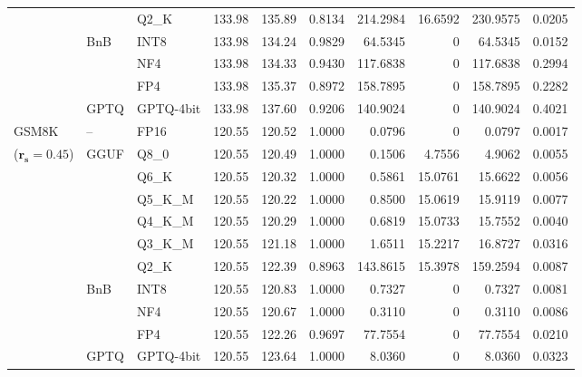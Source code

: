 \begin{longtable}{ll l rrrrrrr}
 &  & Q2\_K & 133.98 & 135.89 & \cellcolor{red!18} 0.8134 & \cellcolor{red!18} 214.2984 & 16.6592 & \cellcolor{red!18} 230.9575 & \cellcolor{red!18} 0.0205 \\
 & BnB & INT8 & 133.98 & 134.24 & 0.9829 & 64.5345 & \cellcolor{cyan!12} $0$ & 64.5345 & 0.0152 \\
 &  & NF4 & 133.98 & 134.33 & \cellcolor{red!18} 0.9430 & \cellcolor{red!18} 117.6838 & \cellcolor{cyan!12} $0$ & \cellcolor{red!18} 117.6838 & \cellcolor{red!18} 0.2994 \\
 &  & FP4 & 133.98 & 135.37 & \cellcolor{red!18} 0.8972 & \cellcolor{red!18} 158.7895 & \cellcolor{cyan!12} $0$ & \cellcolor{red!18} 158.7895 & \cellcolor{red!18} 0.2282 \\
 & GPTQ & GPTQ-4bit & 133.98 & 137.60 & \cellcolor{red!18} 0.9206 & \cellcolor{red!18} 140.9024 & \cellcolor{cyan!12} $0$ & \cellcolor{red!18} 140.9024 & \cellcolor{red!18} 0.4021 \\
\midrule
GSM8K & -- & FP16 & 120.55 & 120.52 & 1.0000 & 0.0796 & \cellcolor{cyan!12} $0$ & 0.0797 & 0.0017 \\
{\small ($\mathbf{r_s{=}0.45}$)} & GGUF & Q8\_0 & 120.55 & 120.49 & 1.0000 & 0.1506 & 4.7556 & 4.9062 & 0.0055 \\
 &  & Q6\_K & 120.55 & 120.32 & 1.0000 & 0.5861 & 15.0761 & 15.6622 & 0.0056 \\
 &  & Q5\_K\_M & 120.55 & 120.22 & 1.0000 & 0.8500 & 15.0619 & 15.9119 & 0.0077 \\
 &  & Q4\_K\_M & 120.55 & 120.29 & 1.0000 & 0.6819 & 15.0733 & 15.7552 & 0.0040 \\
 &  & Q3\_K\_M & 120.55 & 121.18 & 1.0000 & 1.6511 & 15.2217 & 16.8727 & 0.0316 \\
 &  & Q2\_K & 120.55 & 122.39 & \cellcolor{red!18} 0.8963 & \cellcolor{red!18} 143.8615 & 15.3978 & \cellcolor{red!18} 159.2594 & \cellcolor{red!18} 0.0087 \\
 & BnB & INT8 & 120.55 & 120.83 & 1.0000 & 0.7327 & \cellcolor{cyan!12} $0$ & 0.7327 & 0.0081 \\
 &  & NF4 & 120.55 & 120.67 & 1.0000 & 0.3110 & \cellcolor{cyan!12} $0$ & 0.3110 & 0.0086 \\
 &  & FP4 & 120.55 & 122.26 & 0.9697 & 77.7554 & \cellcolor{cyan!12} $0$ & 77.7554 & 0.0210 \\
 & GPTQ & GPTQ-4bit & 120.55 & 123.64 & 1.0000 & 8.0360 & \cellcolor{cyan!12} $0$ & 8.0360 & 0.0323 \\
\end{longtable}
\endgroup